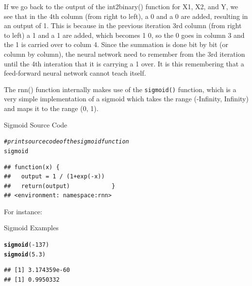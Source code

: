 \documentclass[british]{article}\usepackage[]{graphicx}\usepackage[]{color}
\makeatletter
\newcommand{\hlnum}[1]{\textcolor[rgb]{0.686,0.059,0.569}{#1}}%
\newcommand{\hlcom}[1]{\textcolor[rgb]{0.678,0.584,0.686}{\textit{#1}}}%
\newcommand{\hlopt}[1]{\textcolor[rgb]{0,0,0}{#1}}%
\newcommand{\hlstd}[1]{\textcolor[rgb]{0.345,0.345,0.345}{#1}}%
\newcommand{\hlkwd}[1]{\textcolor[rgb]{0.737,0.353,0.396}{\textbf{#1}}}%
\newenvironment{kframe}{%
 \def\at@end@of@kframe{}%
 \ifinner\ifhmode%
  \def\at@end@of@kframe{\end{minipage}}%
  \begin{minipage}{\columnwidth}%
 \fi\fi%
 \def\FrameCommand##1{\hskip\@totalleftmargin \hskip-\fboxsep
 \colorbox{shadecolor}{##1}\hskip-\fboxsep
     \hskip-\linewidth \hskip-\@totalleftmargin \hskip\columnwidth}%
 \MakeFramed {\advance\hsize-\width
   \@totalleftmargin\z@ \linewidth\hsize
   \@setminipage}}%
 {\par\unskip\endMakeFramed%
 \at@end@of@kframe}
\newenvironment{knitrout}{}{} %
\newcommand{\code}[1]{\texttt{#1}}
\makeatother
\begin{document}
If we go back to the output of the int2binary() function for X1, X2,
and Y, we see that in the 4th column (from right to left), a 0 and
a 0 are added, resulting in an output of 1. This is because in the
previous iteration 3rd column (from right to left) a 1 and a 1 are
added, which becomes 1 0, so the 0 goes in column 3 and the 1 is carried
over to colum 4. Since the summation is done bit by bit (or column
by column), the neural network need to remember from the 3rd iteration
until the 4th interation that it is carrying a 1 over. It is this
remembering that a feed-forward neural network cannot teach itself.

The rnn() function internally makes use of the \code{sigmoid()} function,
which is a very simple implementation of a sigmoid which takes the
range (-Infinity, Infinity) and maps it to the range (0, 1).

\begin{table}[H]


\caption{Sigmoid Source Code}


\begin{knitrout}
\color{fgcolor}\begin{kframe}
\begin{alltt}
\hlcom{# print source code of the sigmoid function}
\hlstd{sigmoid}
\end{alltt}
\begin{verbatim}
## function(x) {
##   output = 1 / (1+exp(-x))
##   return(output)            }
## <environment: namespace:rnn>
\end{verbatim}
\end{kframe}
\end{knitrout}

\end{table}


For instance:

\begin{table}[H]


\caption{Sigmoid Examples}


\begin{knitrout}
\color{fgcolor}\begin{kframe}
\begin{alltt}
\hlkwd{sigmoid}\hlstd{(}\hlopt{-}\hlnum{137}\hlstd{)}
\hlkwd{sigmoid}\hlstd{(}\hlnum{5.3}\hlstd{)}
\end{alltt}
\begin{verbatim}
## [1] 3.174359e-60
## [1] 0.9950332
\end{verbatim}
\end{kframe}
\end{knitrout}

\end{table}
\end{document}
